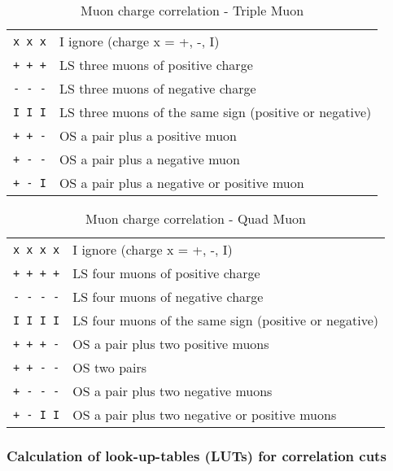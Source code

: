 \begin{table}[ht]
\caption{Muon charge correlation - Triple Muon}
\vspace{5mm}
\centering
\begin{tabular}{|c|l|}\hline
\verb|x x x| & I  ignore (charge x = +, -, I) \\
\verb|+ + +| & LS three muons of positive charge \\
\verb|- - -| & LS three muons of negative charge \\
\verb|I I I| & LS three muons of the same sign (positive or negative) \\
\verb|+ + -| & OS a pair plus a positive muon \\
\verb|+ - -| & OS a pair plus a negative muon \\
\verb|+ - I| & OS a pair plus a negative or positive muon \\\hline
\end{tabular}
\label{tab:gtl:muon_charge_corr_triple}
\end{table}

\begin{table}[ht]
\caption{Muon charge correlation - Quad Muon}
\vspace{5mm}
\centering
\begin{tabular}{|c|l|}\hline
\verb|x x x x| & I  ignore (charge x = +, -, I) \\
\verb|+ + + +| & LS four muons of positive charge \\
\verb|- - - -| & LS four muons of negative charge \\
\verb|I I I I| & LS four muons of the same sign (positive or negative) \\
\verb|+ + + -| & OS a pair plus two positive muons \\
\verb|+ + - -| & OS two pairs \\
\verb|+ - - -| & OS a pair plus two negative muons \\
\verb|+ - I I| & OS a pair plus two negative or positive muons \\\hline
\end{tabular}
\label{tab:gtl:muon_charge_corr_quad}
\end{table}

\clearpage

\subsubsection{Calculation of look-up-tables (LUTs) for correlation cuts}
\label{sec:gtl:calc_luts_corr_cuts}

